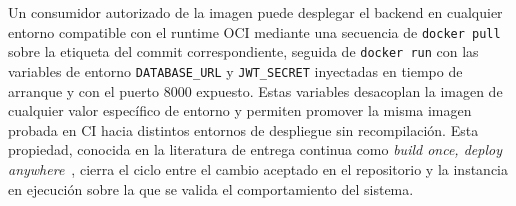 Un consumidor autorizado de la imagen puede desplegar el backend
en cualquier entorno compatible con el runtime OCI mediante una
secuencia de \texttt{docker pull} sobre la etiqueta del commit
correspondiente, seguida de \texttt{docker run} con las variables
de entorno \texttt{DATABASE\_URL} y \texttt{JWT\_SECRET} inyectadas
en tiempo de arranque y con el puerto 8000 expuesto. Estas
variables desacoplan la imagen de cualquier valor específico de
entorno y permiten promover la misma imagen probada en CI hacia
distintos entornos de despliegue sin recompilación. Esta
propiedad, conocida en la literatura de entrega continua como
\textit{build once, deploy anywhere}~\cite{humble2010cd}, cierra
el ciclo entre el cambio aceptado en el repositorio y la instancia
en ejecución sobre la que se valida el comportamiento del sistema.